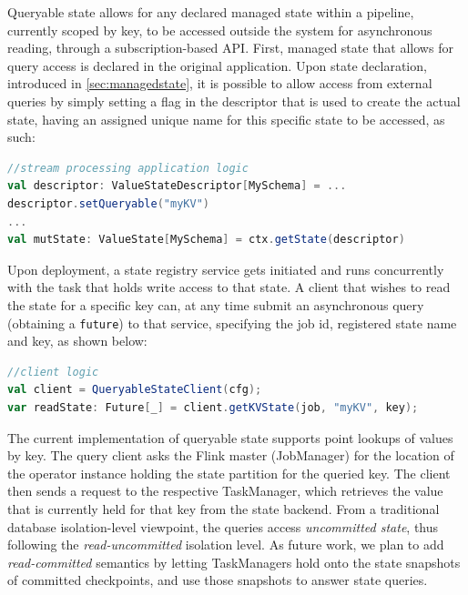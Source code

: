 Queryable state allows for any declared managed state within a pipeline, currently scoped by key, to be accessed outside the system for asynchronous reading, through a subscription-based API. First, managed state that allows for query access is declared in the original application. Upon state declaration, introduced in \autoref{sec:managedstate}, it is possible to allow access from external queries by simply setting a flag in the descriptor that is used to create the actual state, having an assigned unique name for this specific state to be accessed, as such:

\begin{lstlisting}[language=scala]
//stream processing application logic
val descriptor: ValueStateDescriptor[MySchema] = ...
descriptor.setQueryable("myKV")
...
val mutState: ValueState[MySchema] = ctx.getState(descriptor)
\end{lstlisting}

\para{} Upon deployment, a state registry service gets initiated and runs concurrently with the task that holds write access to that state. A client that wishes to read the state for a specific key can, at any time submit an asynchronous query (obtaining a \texttt{future}) to that service, specifying the job id, registered state name and key, as shown below:

\begin{lstlisting}[language=scala]
//client logic
val client = QueryableStateClient(cfg);
var readState: Future[_] = client.getKVState(job, "myKV", key);
\end{lstlisting}

The current implementation of queryable state supports point lookups of values by key. The query client asks the Flink master (JobManager) for the location of the operator instance holding the state partition for the queried key. The client then sends a request to the respective TaskManager, which retrieves the value that is currently held for that key from the state backend. From a traditional database isolation-level viewpoint, the queries access \emph{uncommitted state}, thus following the \emph{read-uncommitted} isolation level. As future work, we plan to add \emph{read-committed} semantics by letting TaskManagers hold onto the state snapshots of committed checkpoints, and use those snapshots to answer state queries.


